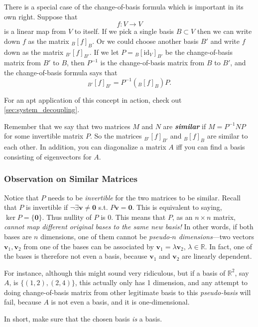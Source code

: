 \documentclass[12pt]{report}
\theoremstyle{definition}
\begin{document}
There is a special case of the change-of-basis formula which is important in its
own right. Suppose that\[
    f:V\rightarrow V
\]is a linear map from $V$ to itself. If we pick a single basis $B\subset V$
then we can write down $f$ as the matrix ${}_B{[f]}_{B}$.
Or we could choose another basis $B'$ and write $f$ down as the matrix
${}_{B'}{[f]}_{B'}$. If we let $P={}_B{[\text{id}_V]}_{B'}$ be the
change-of-basis matrix from $B'$ to $B$, then $P^{-1}$ is the change-of-basis 
matrix from $B$ to $B'$, and the change-of-basis formula says that\[
    {}_{B'}{[f]}_{B'} = P^{-1}\left({}_B{[f]}_{B}\right)P.
\]

For an apt application of this concept in action, check out
\autoref{sec:system_decoupling}. 

Remember that we say that two matrices $M$ and $N$ are \textbf{\emph{similar}}
if $M = P^{-1}NP$ for some invertible matrix $P$. So the matrices
${}_{B'}{[f]}_{B'}$ and ${}_B{[f]}_{B}$ are similar to each other.
In addition, you can diagonalize a matrix $A$ iff you can find a basis consisting
of eigenvectors for $A$.

\subsubsection{Observation on Similar Matrices}

Notice that $P$ needs to be \emph{invertible} for the two matrices to be
similar. Recall that $P$ is invertible if $\neg\exists \mathbf{v}\neq\mathbf{0}$
s.t. $P\mathbf{v}=\mathbf{0}$.
This is equivalent to saying, $\ker{P} = \{\mathbf{0}\}$.
Thus nullity of $P$ is 0. 
This means that $P$, as an $n\times n$ matrix,
\emph{cannot map different original bases to the same new basis!}
In other words, if both bases are $n$ dimensions, one of them cannot be
\emph{pseudo-$n$ dimensions}---two vectors $\mathbf{v}_1, \mathbf{v}_2$
from one of the bases can be associated by $\mathbf{v}_1 = \lambda\mathbf{v}_2$,
$\lambda\in\mathbb{R}$.
In fact, one of the bases is therefore not even a basis,
because $\mathbf{v}_1$ and $\mathbf{v}_2$ are linearly dependent.

\medskip
\noindent For instance, although this might sound very ridiculous, but if a basis of
$\mathbb{R}^{2}$, say $A$, is $\{(1, 2), (2, 4)\}$,
this actually only has 1 dimension,
and any attempt to doing change-of-basis matrix from other legitimate basis 
to this \emph{pseudo-basis} will fail, because $A$ is not even a basis, and it
is one-dimensional.

\medskip
\noindent In short, make sure that the chosen basis \emph{is} a basis.
\end{document}
